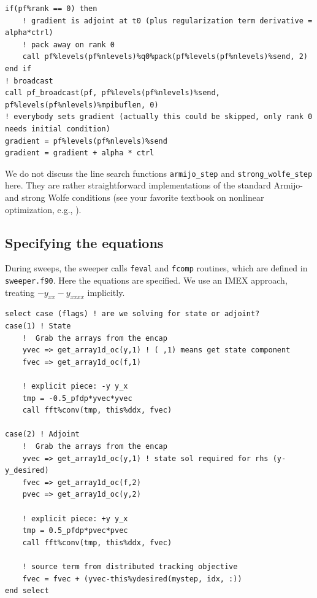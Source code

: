 \documentclass[a4paper]{article} %
\begin{document}
\begin{lstlisting}[frame=tb,caption={Excerpt of \lstinline|evalute_gradient| from \lstinline|pf_optimization_1d.f90|},label=lst:evalgrad]
if(pf%rank == 0) then
	! gradient is adjoint at t0 (plus regularization term derivative = alpha*ctrl)
	! pack away on rank 0
	call pf%levels(pf%nlevels)%q0%pack(pf%levels(pf%nlevels)%send, 2)
end if
! broadcast
call pf_broadcast(pf, pf%levels(pf%nlevels)%send, pf%levels(pf%nlevels)%mpibuflen, 0)
! everybody sets gradient (actually this could be skipped, only rank 0 needs initial condition)
gradient = pf%levels(pf%nlevels)%send
gradient = gradient + alpha * ctrl
\end{lstlisting}

We do not discuss the line search functions \lstinline|armijo_step| and \lstinline|strong_wolfe_step| here. They are rather straightforward implementations of the standard Armijo- and strong Wolfe conditions (see your favorite textbook on nonlinear optimization, e.g., \cite{NocedalWright2006}).

\subsection{Specifying the equations}

During sweeps, the sweeper calls \lstinline|feval| and \lstinline|fcomp| routines, which are defined in \lstinline|sweeper.f90|. Here the equations are specified. We use an IMEX approach, treating $-y_{xx}-y_{xxxx}$ implicitly.

\begin{lstlisting}[frame=tb,caption={Excerpt of \lstinline|feval| from \lstinline|sweeper.f90|},label=lst:feval]
select case (flags) ! are we solving for state or adjoint?
case(1) ! State
	!  Grab the arrays from the encap
	yvec => get_array1d_oc(y,1) ! ( ,1) means get state component
	fvec => get_array1d_oc(f,1)

	! explicit piece: -y y_x
	tmp = -0.5_pfdp*yvec*yvec
	call fft%conv(tmp, this%ddx, fvec)

case(2) ! Adjoint
	!  Grab the arrays from the encap
	yvec => get_array1d_oc(y,1) ! state sol required for rhs (y-y_desired)
	fvec => get_array1d_oc(f,2)
	pvec => get_array1d_oc(y,2)

	! explicit piece: +y y_x
	tmp = 0.5_pfdp*pvec*pvec
	call fft%conv(tmp, this%ddx, fvec)

	! source term from distributed tracking objective
	fvec = fvec + (yvec-this%ydesired(mystep, idx, :))
end select
\end{lstlisting}
\end{document}
